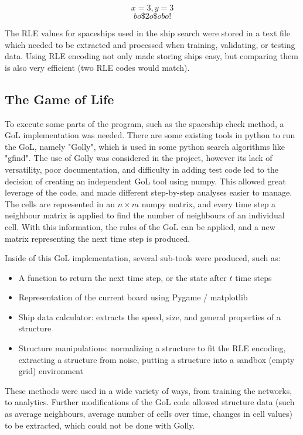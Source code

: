 \documentclass{l4proj}
\begin{document}
\[ x=3,y=3 \]
\[ bo\$2o\$obo! \]

The RLE values for spaceships used in the ship search were stored in a text file which needed to be extracted and processed when training, validating, or testing data. Using RLE encoding not only made storing ships easy, but comparing them is also very efficient (two RLE codes would match).

\subsection{The Game of Life}

To execute some parts of the program, such as the spaceship check method, a GoL implementation was needed. There are some existing tools in python to run the GoL, namely "Golly", which is used in some python search algorithms like "gfind". The use of Golly was considered in the project, however its lack of versatility, poor documentation, and difficulty in adding test code led to the decision of creating an independent GoL tool using numpy. This allowed great leverage of the code, and made different step-by-step analyses easier to manage. The cells are represented in an $n \times m$ numpy matrix, and every time step a neighbour matrix is applied to find the number of neighbours of an individual cell. With this information, the rules of the GoL can be applied, and a new matrix representing the next time step is produced. 

Inside of this GoL implementation, several sub-tools were produced, such as:
\begin{itemize}
    \item A function to return the next time step, or the state after $t$ time steps 
    \item Representation of the current board using Pygame / matplotlib
    \item Ship data calculator: extracts the speed, size, and general properties of a structure
    \item Structure manipulations: normalizing a structure to fit the RLE encoding, extracting a structure from noise, putting a structure into a sandbox (empty grid) environment
\end{itemize}

These methods were used in a wide variety of ways, from training the networks, to analytics. Further modifications of the GoL code allowed structure data (such as average neighbours, average number of cells over time, changes in cell values) to be extracted, which could not be done with Golly. 
\end{document}
